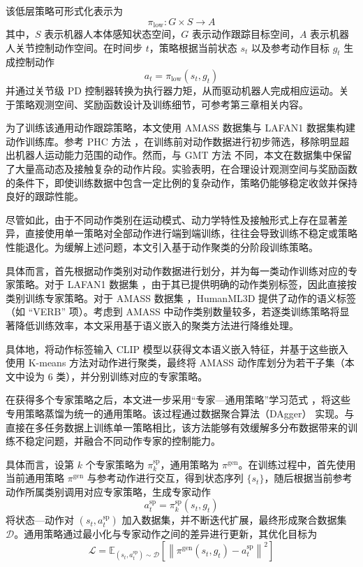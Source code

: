 该低层策略可形式化表示为
\begin{equation}
	\pi_{\mathrm{low}} : G \times S \rightarrow A
\end{equation}
其中，$S$ 表示机器人本体感知状态空间，$G$ 表示动作跟踪目标空间，$A$ 表示机器人关节控制动作空间。在时间步 $t$，策略根据当前状态 $s_t$ 以及参考动作目标 $g_t$ 生成控制动作
\begin{equation}
	a_t = \pi_{\mathrm{low}}(s_t, g_t)
\end{equation}
并通过关节级 PD 控制器转换为执行器力矩，从而驱动机器人完成相应运动。关于策略观测空间、奖励函数设计及训练细节，可参考第三章相关内容。

为了训练该通用动作跟踪策略，本文使用 AMASS 数据集与 LAFAN1 数据集构建动作训练库。参考 PHC 方法 \cite{luo2023perpetual}，在训练前对动作数据进行初步筛选，移除明显超出机器人运动能力范围的动作。然而，与 GMT 方法 \cite{chen2025gmt} 不同，本文在数据集中保留了大量高动态及接触复杂的动作片段。实验表明，在合理设计观测空间与奖励函数的条件下，即使训练数据中包含一定比例的复杂动作，策略仍能够稳定收敛并保持良好的跟踪性能。

尽管如此，由于不同动作类别在运动模式、动力学特性及接触形式上存在显著差异，直接使用单一策略对全部动作进行端到端训练，往往会导致训练不稳定或策略性能退化。为缓解上述问题，本文引入基于动作聚类的分阶段训练策略。

具体而言，首先根据动作类别对动作数据进行划分，并为每一类动作训练对应的专家策略。对于 LAFAN1 数据集 \cite{harvey2020robust}，由于其已提供明确的动作类别标签，因此直接按类别训练专家策略。对于 AMASS 数据集 \cite{mahmood2019amass}，HumanML3D \cite{guo2022generating} 提供了动作的语义标签（如 ``VERB'' 项）。考虑到 AMASS 中动作类别数量较多，若逐类训练策略将显著降低训练效率，本文采用基于语义嵌入的聚类方法进行降维处理。

具体地，将动作标签输入 CLIP \cite{radford2021learning} 模型以获得文本语义嵌入特征，并基于这些嵌入使用 K-means \cite{mcqueen1967some} 方法对动作进行聚类，最终将 AMASS 动作库划分为若干子集（本文中设为 6 类），并分别训练对应的专家策略。

在获得多个专家策略之后，本文进一步采用“专家—通用策略”学习范式 \cite{zhang2025unleashing}，将这些专用策略蒸馏为统一的通用策略。该过程通过数据聚合算法（DAgger）\cite{ross2011reduction} 实现。与直接在多任务数据上训练单一策略相比，该方法能够有效缓解多分布数据带来的训练不稳定问题，并融合不同动作专家的控制能力。

具体而言，设第 $k$ 个专家策略为 $\pi_k^{\mathrm{sp}}$，通用策略为 $\pi^{\mathrm{gen}}$。在训练过程中，首先使用当前通用策略 $\pi^{\mathrm{gen}}$ 与参考动作进行交互，得到状态序列 $\{s_t\}$，随后根据当前参考动作所属类别调用对应专家策略，生成专家动作
\begin{equation}
	a_t^{\mathrm{sp}} = \pi_k^{\mathrm{sp}}(s_t, g_t)
\end{equation}
将状态—动作对 $(s_t, a_t^{\mathrm{sp}})$ 加入数据集，并不断迭代扩展，最终形成聚合数据集 $\mathcal{D}$。通用策略通过最小化与专家动作之间的差异进行更新，其优化目标为
\begin{equation}
	\mathcal{L} =
	\mathbb{E}_{(s_t,a_t^{\mathrm{sp}})\sim \mathcal{D}}
	\left[
	\left\|
	\pi^{\mathrm{gen}}(s_t,g_t) - a_t^{\mathrm{sp}}
	\right\|^2
	\right]
\end{equation}

